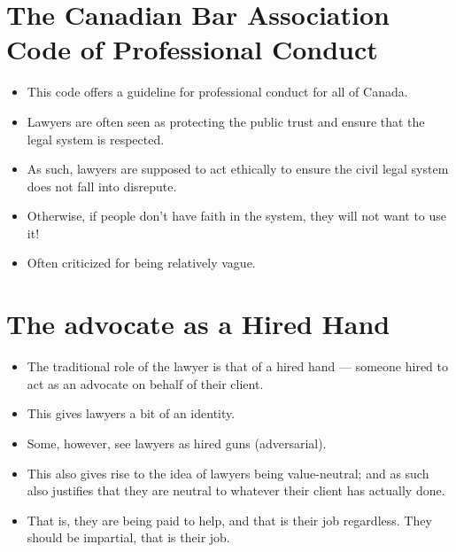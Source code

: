 \documentclass{article}
\begin{document}
\section{The Canadian Bar Association Code of Professional Conduct}
\begin{itemize}
    \item This code offers a guideline for professional conduct for all of Canada.
    \item Lawyers are often seen as protecting the public trust and ensure that the legal system is respected.
    \item As such, lawyers are supposed to act ethically to ensure the civil legal system does not fall into disrepute.
    \item Otherwise, if people don't have faith in the system, they will not want to use it!
    \item Often criticized for being relatively vague.
\end{itemize}

\section{The advocate as a Hired Hand}
\begin{itemize}
    \item The traditional role of the lawyer is that of a hired hand --- someone hired to act as an advocate on behalf of their client.
    \item This gives lawyers a bit of an identity.
    \item Some, however, see lawyers as hired guns (adversarial).
    \item This also gives rise to the idea of lawyers being value-neutral; and as such also justifies that they are neutral to whatever their client has actually done.
    \item That is, they are being paid to help, and that is their job regardless.  They should be impartial, that is their job.
\end{itemize}
\end{document}
